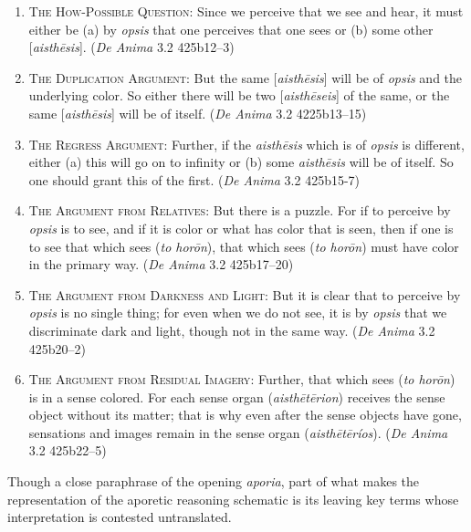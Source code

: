 \begin{enumerate}[(1)]
	\item \textsc{The How-Possible Question}: Since we perceive that we see and hear, it must either be (a) by \emph{opsis} that one perceives that one sees or (b) some other [\emph{aisthēsis}]. (\emph{De Anima} 3.2 425b12–3)
	\item \textsc{The Duplication Argument}: But the same [\emph{aisthēsis}] will be of \emph{opsis} and the underlying color. So either there will be two [\emph{aisthēseis}] of the same, or the same [\emph{aisthēsis}] will be of itself. (\emph{De Anima} 3.2 4225b13–15)
	\item \textsc{The Regress Argument}: Further, if the \emph{aisthēsis} which is of \emph{opsis} is different, either (a) this will go on to infinity or (b) some \emph{aisthēsis} will be of itself. So one should grant this of the first. (\emph{De Anima} 3.2 425b15-7)
	\item \textsc{The Argument from Relatives}: But there is a puzzle. For if to perceive by \emph{opsis} is to see, and if it is color or what has color that is seen, then if one is to see that which sees (\emph{to horōn}), that which sees (\emph{to horōn}) must have color in the primary way. (\emph{De Anima} 3.2 425b17–20)
	\item \textsc{The Argument from Darkness and Light}: But it is clear that to perceive by \emph{opsis} is no single thing; for even when we do not see, it is by \emph{opsis} that we discriminate dark and light, though not in the same way. (\emph{De Anima} 3.2 425b20–2)
	\item \textsc{The Argument from Residual Imagery}: Further, that which sees (\emph{to horōn}) is in a sense colored. For each sense organ (\emph{aisthētērion}) receives the sense object without its matter; that is why even after the sense objects have gone, sensations and images remain in the sense organ (\emph{aisthētēríos}). (\emph{De Anima} 3.2 425b22–5)
\end{enumerate} 

Though a close paraphrase of the opening \emph{aporia}, part of what makes the representation of the aporetic reasoning schematic is its leaving key terms whose interpretation is contested untranslated. 


